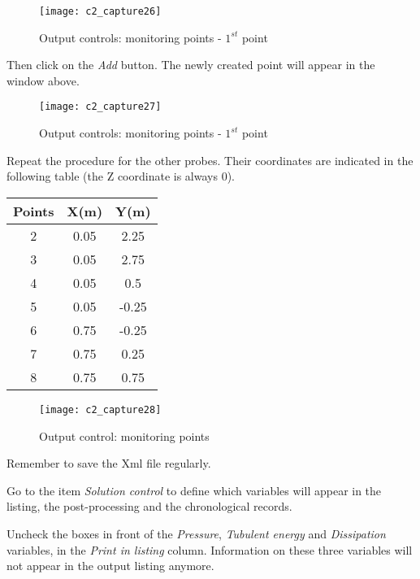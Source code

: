 \begin{figure}[h!]
\begin{center}
\texttt{[image: c2\_capture26]}
\caption{Output controls: monitoring points - $1^{st}$ point}
\label{fig26_e2}
\end{center}
\end{figure}


\newpage
Then click on the {\itshape Add} button. The newly created point will appear in
the window above.

\begin{figure}[h!]
\begin{center}
\texttt{[image: c2\_capture27]}
\caption{Output controls: monitoring points - $1^{st}$ point}
\label{fig27_e2}
\end{center}
\end{figure}


\newpage
Repeat the procedure for the other probes. Their coordinates are indicated in
the following table (the Z coordinate is always 0).
\begin{center}
\begin{tabular}{|c|c|c|}
\hline
Points & X(m) & Y(m) \\
\hline
2 & 0.05 & 2.25 \\
\hline
3 & 0.05 & 2.75 \\
\hline
4 & 0.05 & 0.5 \\
\hline
5 & 0.05 & -0.25 \\
\hline
6 & 0.75 & -0.25 \\
\hline
7 & 0.75 & 0.25 \\
\hline
8 & 0.75 & 0.75 \\
\hline
\end{tabular}
\end{center}

\begin{figure}[h!]
\begin{center}
\texttt{[image: c2\_capture28]}
\caption{Output control: monitoring points}
\label{fig28_e2}
\end{center}
\end{figure}

Remember to save the Xml file regularly.


\newpage
Go to the item {\itshape Solution control} to define which variables will
appear in the listing, the post-processing and the chronological records.

Uncheck the boxes in front of the {\itshape Pressure}, {\itshape Tubulent energy}
and {\itshape Dissipation} variables, in the {\itshape  Print in listing}
column. Information on these three variables will not appear in the output
listing anymore.

